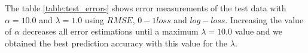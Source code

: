 The table \ref{table:test_errors} shows error measurements of the test data with $\alpha=10.0$ and $\lambda=1.0$ using $RMSE$, $0-1 loss$ and $log-loss$. Increasing the value of $\alpha$ decreases all error estimations until a maximum $\lambda=10.0$ value and we obtained the best prediction accuracy with this value for the $\lambda$.